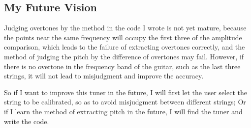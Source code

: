 \documentclass{article}
\begin{document}
\subsection{My Future Vision}
Judging overtones by the method in the code I wrote is not yet mature, because the points near the same frequency will occupy the first three of the amplitude comparison, which leads to the failure of extracting overtones correctly, and the method of judging the pitch by the difference of overtones may fail. However, if there is no overtone in the frequency band of the guitar, such as the last three strings, it will not lead to misjudgment and improve the accuracy.

So if I want to improve this tuner in the future, I will first let the user select the string to be calibrated, so as to avoid misjudgment between different strings; Or if I learn the method of extracting pitch in the future, I will find the tuner and write the code.




\end{document}

